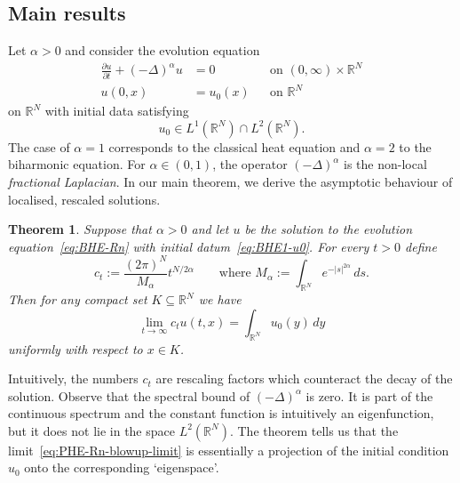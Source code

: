 \documentclass[a4paper, reqno]{amsart}
\numberwithin{equation}{section}
\theoremstyle{plain}
\newtheorem{theorem}{Theorem}[section]
\theoremstyle{definition}
\theoremstyle{remark}
\newcommand{\RR}{\mathbb{R}}
\begin{document}
\subsection{Main results}
Let $\alpha > 0$ and consider the evolution equation
\begin{equation}
  \label{eq:BHE-Rn}
  \begin{aligned}
    \frac{\partial u}{\partial t} + (-\Delta)^{\alpha} u & = 0
                                                         &          & \text{on } (0, \infty) \times \RR^N \\
    u(0, x)                                              & = u_0(x)
                                                         &          & \text{on } \RR^N
  \end{aligned}
\end{equation}
on $\RR^N$ with initial data satisfying
\begin{equation}
  \label{eq:BHE1-u0}
  u_0 \in L^1(\RR^N) \cap L^2(\RR^N).
\end{equation}
The case of $\alpha=1$ corresponds to the classical heat equation and $\alpha=2$ to the biharmonic equation. For $\alpha \in (0, 1)$, the operator $(-\Delta)^\alpha$ is the non-local \emph{fractional Laplacian}. In our main theorem, we derive the asymptotic behaviour of localised, rescaled solutions.

\begin{theorem}
  \label{thm:BHE-Rn}
  Suppose that $\alpha > 0$ and let $u$ be the solution to the evolution equation~\eqref{eq:BHE-Rn} with initial datum~\eqref{eq:BHE1-u0}. For every $t > 0$ define
  \begin{equation}
    \label{eq:PHE-Rn-ct}
    c_t := \frac{(2\pi)^N}{M_\alpha}t^{N/2\alpha} \qquad \text{where } M_\alpha:= \int_{\RR^N} e^{-|s|^{2\alpha}} \,ds.
  \end{equation}
  Then for any compact set $K \subseteq \RR^N$ we have
  \begin{equation}
    \label{eq:PHE-Rn-blowup-limit}
    \lim_{t\to\infty}c_t u(t,x)
    =\int_{\RR^N} u_0(y)\,dy
  \end{equation}
  uniformly with respect to $x\in K$.
\end{theorem}

Intuitively, the numbers $c_t$ are rescaling factors which counteract the decay of the solution. Observe that the spectral bound of $(-\Delta)^{\alpha}$ is zero. It is part of the continuous spectrum and the constant function is intuitively an eigenfunction, but it does not lie in the space $L^2(\RR^N)$. The theorem tells us that the limit~\eqref{eq:PHE-Rn-blowup-limit} is essentially a projection of the initial condition $u_0$ onto the corresponding `eigenspace'.
\end{document}

